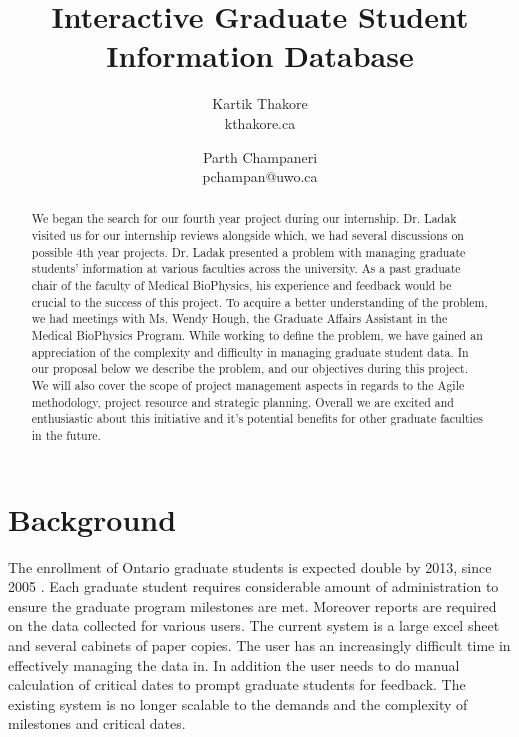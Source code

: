 \documentclass{journal}
\begin{document}

\title{Interactive Graduate Student Information Database} 
\author{Kartik Thakore\\kthakore\@uwo.ca \and Parth Champaneri\\pchampan@uwo.ca}
\maketitle

\begin{abstract}
We began the search for our fourth year project during our internship. Dr. Ladak visited us for our internship reviews alongside which, we had several discussions on possible 4th year projects.  Dr. Ladak presented a problem with managing graduate students’ information at various faculties across the university. As a past graduate chair of the faculty of Medical BioPhysics, his experience and feedback would be crucial to the success of this project. To acquire a better understanding of the problem, we had meetings with Ms. Wendy Hough, the Graduate Affairs Assistant in the Medical BioPhysics Program. While working to define the problem, we have gained an appreciation of the complexity and difficulty in managing graduate student data. In our proposal below we describe the problem, and our objectives during this project. We will also cover the scope of project management aspects in regards to the Agile methodology, project resource and strategic planning. Overall we are excited and enthusiastic about this initiative and it's potential benefits for other graduate faculties in the future.
\end{abstract}

\section{Background}

The enrollment of Ontario graduate students is expected double by 2013, since 2005 \cite{con_high}.  Each graduate student requires considerable
amount of administration to ensure the graduate program milestones are met. Moreover reports are required on the data collected for various users.
The current system is a large excel sheet and several cabinets of paper copies. The user has an increasingly difficult time in effectively managing 
the data in. In addition the user needs to do manual calculation of critical dates to prompt graduate students for feedback. 
The existing system is no longer scalable to the demands and the complexity of milestones and critical dates. 
\end{document}
